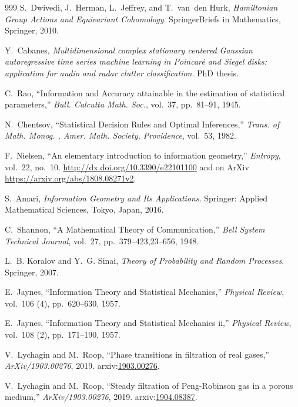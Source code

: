 \documentclass[10pt,a4paper]{article}
\begin{document}
\begin{thebibliography}{999}
S.~{D}wivedi, J.~{H}erman, L.~{J}effrey, and T.~van~den {H}urk, {\em
  {H}amiltonian {G}roup {A}ctions and {E}quivariant {C}ohomology}.
\newblock SpringerBriefs in Mathematics, Springer, 2010.

Y.~{C}abanes, {\em {M}ultidimensional complex stationary centered {G}aussian
  autoregressive time series machine learning in {P}oincaré and {S}iegel
  disks: application for audio and radar clutter classiﬁcation}.
\newblock PhD thesis.

C.~Rao, ``{I}nformation and {A}ccuracy attainable in the estimation of
  statistical parameters,'' {\em Bull. Calcutta Math. Soc.}, vol.~37,
  pp.~81--91, 1945.

N.~Chentsov, ``{S}tatistical {D}ecision {R}ules and {O}ptimal {I}nferences,''
  {\em Trans. of Math. Monog. , Amer. Math. Society, Providence}, vol.~53,
  1982.

F.~Nielsen, ``An elementary introduction to information geometry,'' {\em
  Entropy}, vol.~22, no.~10.
\newblock \url{http://dx.doi.org/10.3390/e22101100} and on ArXiv
  \url{https://arxiv.org/abs/1808.08271v2}.

S.~Amari, {\em {I}nformation {G}eometry and {I}ts {A}pplications}.
\newblock Springer: Applied Mathematical Sciences, Tokyo, Japan, 2016.

C.~Shannon, ``A {M}athematical {T}heory of {C}ommunication,'' {\em Bell System
  Technical Journal}, vol.~27, pp.~379--423,23--656, 1948.

L.~B. {K}oralov and Y.~G. {S}inai, {\em {T}heory of {P}robability and {R}andom
  {P}rocesses}.
\newblock Springer, 2007.

E.~{J}aynes, ``{I}nformation {T}heory and {S}tatistical {M}echanics,'' {\em
  Physical Review}, vol.~106 (4), pp.~620--630, 1957.

E.~{J}aynes, ``{I}nformation {T}heory and {S}tatistical {M}echanics ii,'' {\em
  Physical Review}, vol.~108 (2), pp.~171--190, 1957.

V.~Lychagin and M.~Roop, ``Phase transitions in filtration of real gases,''
  {\em ArXiv/1903.00276}, 2019.
\newblock arxiv:\href{https://arxiv.org/abs/1903.00276}{1903.00276}.

V.~{L}ychagin and M.~{R}oop, ``Steady filtration of {P}eng-{R}obinson gas in a
  porous medium,'' {\em ArXiv/1903.00276}, 2019.
\newblock arxiv:\href{https://arxiv.org/abs/1904.08387}{1904.08387}.


\end{thebibliography}
\end{document}
